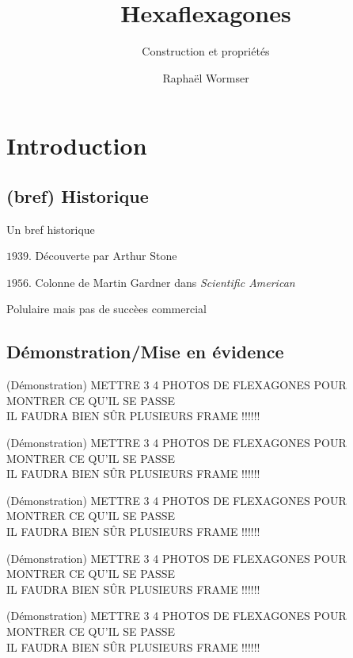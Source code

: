 \documentclass[french,xcolor=dvipsnames]{beamer}
\begin{document}
	\author{Raphaël Wormser}
	\title{Hexaflexagones}
	\subtitle{Construction et propriétés}
	\frame[plain]{\maketitle}
	

\AtBeginSection
{
}

	
	\section{Introduction}
		\subsection{(bref) Historique}
		\begin{frame}{Un bref historique}

			\begin{list}{Intro}{}
				\item[$\textit{1939}$.] Découverte  par Arthur Stone
				\item[$\textit{1956}$.]Colonne de Martin Gardner dans \textit{Scientific American}
				\item[Polulaire mais pas de succèes commercial]
			\end{list}
		\end{frame}
		
		\subsection{Démonstration/Mise en évidence}
		\begin{frame}{(Démonstration)}
			METTRE 3 4 PHOTOS DE FLEXAGONES POUR MONTRER CE QU'IL SE PASSE\\
			IL FAUDRA BIEN SÛR PLUSIEURS FRAME !!!!!!
		\end{frame}
		\begin{frame}{(Démonstration)}
			METTRE 3 4 PHOTOS DE FLEXAGONES POUR MONTRER CE QU'IL SE PASSE\\
			IL FAUDRA BIEN SÛR PLUSIEURS FRAME !!!!!!
		\end{frame}
		\begin{frame}{(Démonstration)}
			METTRE 3 4 PHOTOS DE FLEXAGONES POUR MONTRER CE QU'IL SE PASSE\\
			IL FAUDRA BIEN SÛR PLUSIEURS FRAME !!!!!!
		\end{frame}
		\begin{frame}{(Démonstration)}
			METTRE 3 4 PHOTOS DE FLEXAGONES POUR MONTRER CE QU'IL SE PASSE\\
			IL FAUDRA BIEN SÛR PLUSIEURS FRAME !!!!!!
		\end{frame}
		\begin{frame}{(Démonstration)}
			METTRE 3 4 PHOTOS DE FLEXAGONES POUR MONTRER CE QU'IL SE PASSE\\
			IL FAUDRA BIEN SÛR PLUSIEURS FRAME !!!!!!
		\end{frame}
		
\end{document}
